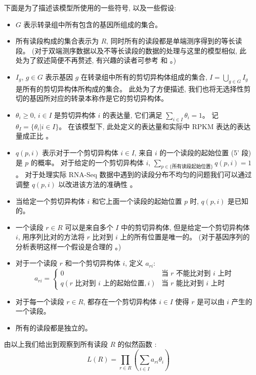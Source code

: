 下面是为了描述该模型所使用的一些符号, 以及一些假设: 
\begin{itemize}
\item $G$ 表示转录组中所有包含的基因所组成的集合。 

\item 所有读段构成的集合表示为 $R$, 同时所有的读段都是单端测序得到的等长读段。 
(对于双端测序数据以及不等长读段的数据的处理与这里的模型相似, 此处为了叙述简便不再赘述, 
有兴趣的读者可参考  和 。)

\item $I_g$, $g \in G$ 表示基因 $g$ 在转录组中所有的剪切异构体组成的集合, 
$I = \bigcup_{g \in G} I_g$ 是所有的剪切异构体所构成的集合。 
此处为了方便描述, 我们也将无选择性剪切的基因所对应的转录本称作是它的剪切异构体。 

\item $\theta_i \geq 0$, $i \in I$ 是剪切异构体 $i$ 的表达量, 
它们满足 $\sum_{i \in I} \theta_i = 1$。 记 $\theta_I = \{\theta_i | i \in I\}$。
在该模型下, 此处定义的表达量和实际中 RPKM 表达的表达量成正比 \cite{cufflinks.2010}。

\item $q(p, i)$ 表示对于一个剪切异构体 $i \in I$, 
来自 $i$ 的一个读段的起始位置 (5' 段) 是 $p$ 的概率。
对于给定的一个剪切异构体 $i$, 
$\sum_{p \in \{ \text{所有读段起始位置} \}} q(p, i) = 1$。
对于处理实际 RNA-Seq 数据中遇到的读段分布不均匀的问题我们可以通过调整 $q(p,i)$ 
以改进该方法的准确性 \cite{roberts2011improving}。

\item 当给定一个剪切异构体 $i$ 和它上面一个读段的起始位置 $p$ 时, 
$q(p, i)$ 是已知的。

\item 一个读段 $r \in R$ 可以是来自多个 $I$ 中的剪切异构体, 
但是给定一个剪切异构体 $i$, 
用序列比对的方法将 $r$ 比对到 $i$ 上的所有位置是唯一的。 
(对于基因序列的分析表明这样一个假设是合理的 \cite{peng2011t}。) 

\item 对于一个读段 $r$ 和一个剪切异构体 $i$, 定义 $a_{ri}$: 
\[
a_{ri} = \begin{cases}
0 & \text{当 $r$ 不能比对到 $i$ 上时} \\
q(\text{$r$ 比对到 $i$ 上的起始位置},i) & \text{当 $r$ 能比对到 $i$ 上时} \end{cases}
\]

\item 对于每一个读段 $r \in R$, 
都存在一个剪切异构体 $i \in I$ 使得 $r$ 是可以由 $i$ 产生的一个读段。 

\item 所有的读段都是独立的。 
\end{itemize}
由以上我们给出到观察到所有读段 $R$ 的似然函数 \cite{2011arXiv1104.3889P}: 
\begin{equation}
\label{rna-seq-general-likelihood}
L(R) = \prod_{r \in R} (\sum_{i \in I} a_{ri} \theta_i)
\end{equation}

